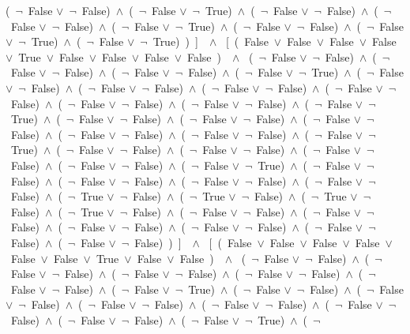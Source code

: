 ﻿\documentclass[a4paper,10pt]{article}
\begin{document}
(\  $\neg$\ False $\vee$\  $\neg$\ False)\ $\wedge$\ (\  $\neg$\ False $\vee$\  $\neg$\ True)\ $\wedge$\ (\  $\neg$\ False $\vee$\  $\neg$\ False)\ $\wedge$\ (\  $\neg$\ False $\vee$\  $\neg$\ False)\ $\wedge$\ (\  $\neg$\ False $\vee$\  $\neg$\ True)\ $\wedge$\ (\  $\neg$\ False $\vee$\  $\neg$\ False)\ $\wedge$\ (\  $\neg$\ False $\vee$\  $\neg$\ True)\ $\wedge$\ (\  $\neg$\ False $\vee$\  $\neg$\ True)\ )\ ]\ \ $\wedge$ \ [\ (\ False\ $\vee$\ False\ $\vee$\ False\ $\vee$\ False\ $\vee$\ True\ $\vee$\ False\ $\vee$\ False\ $\vee$\ False\ $\vee$\ False\ )\ \ $\wedge$ \ (\  $\neg$\ False $\vee$\  $\neg$\ False)\ $\wedge$\ (\  $\neg$\ False $\vee$\  $\neg$\ False)\ $\wedge$\ (\  $\neg$\ False $\vee$\  $\neg$\ False)\ $\wedge$\ (\  $\neg$\ False $\vee$\  $\neg$\ True)\ $\wedge$\ (\  $\neg$\ False $\vee$\  $\neg$\ False)\ $\wedge$\ (\  $\neg$\ False $\vee$\  $\neg$\ False)\ $\wedge$\ (\  $\neg$\ False $\vee$\  $\neg$\ False)\ $\wedge$\ (\  $\neg$\ False $\vee$\  $\neg$\ False)\ $\wedge$\ (\  $\neg$\ False $\vee$\  $\neg$\ False)\ $\wedge$\ (\  $\neg$\ False $\vee$\  $\neg$\ False)\ $\wedge$\ (\  $\neg$\ False $\vee$\  $\neg$\ True)\ $\wedge$\ (\  $\neg$\ False $\vee$\  $\neg$\ False)\ $\wedge$\ (\  $\neg$\ False $\vee$\  $\neg$\ False)\ $\wedge$\ (\  $\neg$\ False $\vee$\  $\neg$\ False)\ $\wedge$\ (\  $\neg$\ False $\vee$\  $\neg$\ False)\ $\wedge$\ (\  $\neg$\ False $\vee$\  $\neg$\ False)\ $\wedge$\ (\  $\neg$\ False $\vee$\  $\neg$\ True)\ $\wedge$\ (\  $\neg$\ False $\vee$\  $\neg$\ False)\ $\wedge$\ (\  $\neg$\ False $\vee$\  $\neg$\ False)\ $\wedge$\ (\  $\neg$\ False $\vee$\  $\neg$\ False)\ $\wedge$\ (\  $\neg$\ False $\vee$\  $\neg$\ False)\ $\wedge$\ (\  $\neg$\ False $\vee$\  $\neg$\ True)\ $\wedge$\ (\  $\neg$\ False $\vee$\  $\neg$\ False)\ $\wedge$\ (\  $\neg$\ False $\vee$\  $\neg$\ False)\ $\wedge$\ (\  $\neg$\ False $\vee$\  $\neg$\ False)\ $\wedge$\ (\  $\neg$\ False $\vee$\  $\neg$\ False)\ $\wedge$\ (\  $\neg$\ True $\vee$\  $\neg$\ False)\ $\wedge$\ (\  $\neg$\ True $\vee$\  $\neg$\ False)\ $\wedge$\ (\  $\neg$\ True $\vee$\  $\neg$\ False)\ $\wedge$\ (\  $\neg$\ True $\vee$\  $\neg$\ False)\ $\wedge$\ (\  $\neg$\ False $\vee$\  $\neg$\ False)\ $\wedge$\ (\  $\neg$\ False $\vee$\  $\neg$\ False)\ $\wedge$\ (\  $\neg$\ False $\vee$\  $\neg$\ False)\ $\wedge$\ (\  $\neg$\ False $\vee$\  $\neg$\ False)\ $\wedge$\ (\  $\neg$\ False $\vee$\  $\neg$\ False)\ $\wedge$\ (\  $\neg$\ False $\vee$\  $\neg$\ False)\ )\ ]\ \ $\wedge$ \ [\ (\ False\ $\vee$\ False\ $\vee$\ False\ $\vee$\ False\ $\vee$\ False\ $\vee$\ False\ $\vee$\ True\ $\vee$\ False\ $\vee$\ False\ )\ \ $\wedge$ \ (\  $\neg$\ False $\vee$\  $\neg$\ False)\ $\wedge$\ (\  $\neg$\ False $\vee$\  $\neg$\ False)\ $\wedge$\ (\  $\neg$\ False $\vee$\  $\neg$\ False)\ $\wedge$\ (\  $\neg$\ False $\vee$\  $\neg$\ False)\ $\wedge$\ (\  $\neg$\ False $\vee$\  $\neg$\ False)\ $\wedge$\ (\  $\neg$\ False $\vee$\  $\neg$\ True)\ $\wedge$\ (\  $\neg$\ False $\vee$\  $\neg$\ False)\ $\wedge$\ (\  $\neg$\ False $\vee$\  $\neg$\ False)\ $\wedge$\ (\  $\neg$\ False $\vee$\  $\neg$\ False)\ $\wedge$\ (\  $\neg$\ False $\vee$\  $\neg$\ False)\ $\wedge$\ (\  $\neg$\ False $\vee$\  $\neg$\ False)\ $\wedge$\ (\  $\neg$\ False $\vee$\  $\neg$\ False)\ $\wedge$\ (\  $\neg$\ False $\vee$\  $\neg$\ True)\ $\wedge$\ (\  $\neg$\ 
\end{document}
